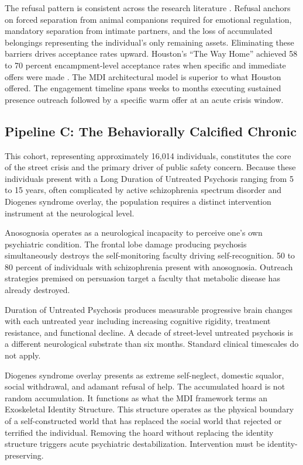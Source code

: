 \documentclass[12pt, letterpaper]{article}
\begin{document}
The refusal pattern is consistent across the research literature \citep{usda_pet_barriers_2023, hud_shelter_barriers_2022}. Refusal anchors on forced separation from animal companions required for emotional regulation, mandatory separation from intimate partners, and the loss of accumulated belongings representing the individual's only remaining assets. Eliminating these barriers drives acceptance rates upward. Houston's ``The Way Home'' achieved 58 to 70 percent encampment-level acceptance rates when specific and immediate offers were made \citep{houston_way_home_2024}. The MDI architectural model is superior to what Houston offered. The engagement timeline spans weeks to months executing sustained presence outreach followed by a specific warm offer at an acute crisis window.

\subsection{Pipeline C: The Behaviorally Calcified Chronic}

This cohort, representing approximately 16,014 individuals, constitutes the core of the street crisis and the primary driver of public safety concern. Because these individuals present with a Long Duration of Untreated Psychosis ranging from 5 to 15 years, often complicated by active schizophrenia spectrum disorder and Diogenes syndrome overlay, the population requires a distinct intervention instrument at the neurological level.

Anosognosia operates as a neurological incapacity to perceive one's own psychiatric condition. The frontal lobe damage producing psychosis simultaneously destroys the self-monitoring faculty driving self-recognition. 50 to 80 percent of individuals with schizophrenia present with anosognosia. Outreach strategies premised on persuasion target a faculty that metabolic disease has already destroyed.

Duration of Untreated Psychosis produces measurable progressive brain changes with each untreated year including increasing cognitive rigidity, treatment resistance, and functional decline. A decade of street-level untreated psychosis is a different neurological substrate than six months. Standard clinical timescales do not apply.

Diogenes syndrome overlay presents as extreme self-neglect, domestic squalor, social withdrawal, and adamant refusal of help. The accumulated hoard is not random accumulation. It functions as what the MDI framework terms an Exoskeletal Identity Structure. This structure operates as the physical boundary of a self-constructed world that has replaced the social world that rejected or terrified the individual. Removing the hoard without replacing the identity structure triggers acute psychiatric destabilization. Intervention must be identity-preserving.
\end{document}
